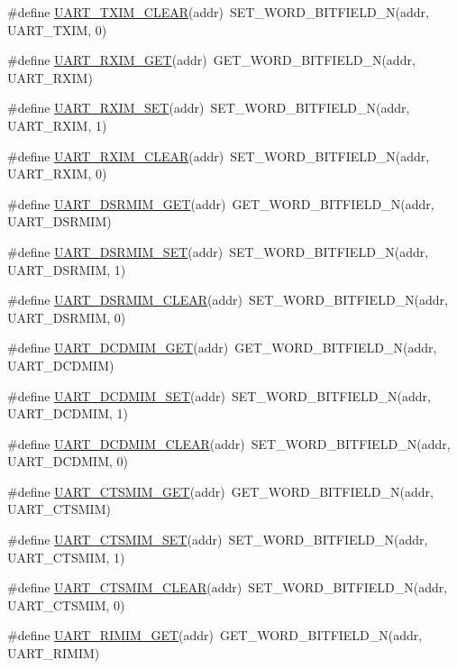 \begin{DoxyCompactItemize}
\item 
\#define \hyperlink{a00574_ad5534bc5b17edf5ff3baca7cdfce7b78}{UART\_\-TXIM\_\-CLEAR}(addr)~SET\_\-WORD\_\-BITFIELD\_\-N(addr, UART\_\-TXIM, 0)
\item 
\#define \hyperlink{a00574_aa753d86115948fd71b875d10fa0e9567}{UART\_\-RXIM\_\-GET}(addr)~GET\_\-WORD\_\-BITFIELD\_\-N(addr, UART\_\-RXIM)
\item 
\#define \hyperlink{a00574_a8be1e38869327fe2cfbe27db7b42caad}{UART\_\-RXIM\_\-SET}(addr)~SET\_\-WORD\_\-BITFIELD\_\-N(addr, UART\_\-RXIM, 1)
\item 
\#define \hyperlink{a00574_a5daad78a3faec5dc0b33d06bd6a27875}{UART\_\-RXIM\_\-CLEAR}(addr)~SET\_\-WORD\_\-BITFIELD\_\-N(addr, UART\_\-RXIM, 0)
\item 
\#define \hyperlink{a00574_af6d43618b702b10f05dc7ca17a872a27}{UART\_\-DSRMIM\_\-GET}(addr)~GET\_\-WORD\_\-BITFIELD\_\-N(addr, UART\_\-DSRMIM)
\item 
\#define \hyperlink{a00574_a058b7b6302034b4ab5950084fbdaab7c}{UART\_\-DSRMIM\_\-SET}(addr)~SET\_\-WORD\_\-BITFIELD\_\-N(addr, UART\_\-DSRMIM, 1)
\item 
\#define \hyperlink{a00574_a0b1a313a097217345967d9594325c57a}{UART\_\-DSRMIM\_\-CLEAR}(addr)~SET\_\-WORD\_\-BITFIELD\_\-N(addr, UART\_\-DSRMIM, 0)
\item 
\#define \hyperlink{a00574_a324c7bcbc770358c6555400262e57f1a}{UART\_\-DCDMIM\_\-GET}(addr)~GET\_\-WORD\_\-BITFIELD\_\-N(addr, UART\_\-DCDMIM)
\item 
\#define \hyperlink{a00574_a5dd0cf665d56421dee7261eb2b39ea4e}{UART\_\-DCDMIM\_\-SET}(addr)~SET\_\-WORD\_\-BITFIELD\_\-N(addr, UART\_\-DCDMIM, 1)
\item 
\#define \hyperlink{a00574_ab4ee25e11ecb7975cc5825da030ac5b5}{UART\_\-DCDMIM\_\-CLEAR}(addr)~SET\_\-WORD\_\-BITFIELD\_\-N(addr, UART\_\-DCDMIM, 0)
\item 
\#define \hyperlink{a00574_a803bfe863274411bc5616bba9d105b54}{UART\_\-CTSMIM\_\-GET}(addr)~GET\_\-WORD\_\-BITFIELD\_\-N(addr, UART\_\-CTSMIM)
\item 
\#define \hyperlink{a00574_a983594d6ada51277fb64429aa1db015b}{UART\_\-CTSMIM\_\-SET}(addr)~SET\_\-WORD\_\-BITFIELD\_\-N(addr, UART\_\-CTSMIM, 1)
\item 
\#define \hyperlink{a00574_a4e971ae05db6023ec286ed9c1cbece8b}{UART\_\-CTSMIM\_\-CLEAR}(addr)~SET\_\-WORD\_\-BITFIELD\_\-N(addr, UART\_\-CTSMIM, 0)
\item 
\#define \hyperlink{a00574_afd495a43904675e8440c83d38571fe05}{UART\_\-RIMIM\_\-GET}(addr)~GET\_\-WORD\_\-BITFIELD\_\-N(addr, UART\_\-RIMIM)

\end{DoxyCompactItemize}

